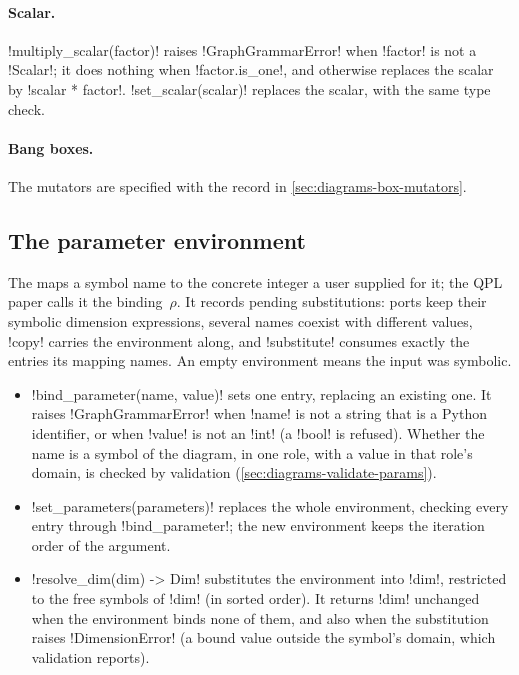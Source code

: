 \paragraph{Scalar.} \py!multiply_scalar(factor)! raises \py!GraphGrammarError! when \py!factor! is not a \py!Scalar!; it does nothing when \py!factor.is_one!, and otherwise replaces the scalar by \py!scalar * factor!. \py!set_scalar(scalar)! replaces the scalar, with the same type check.

\paragraph{Bang boxes.} The \bbox{} mutators are specified with the \bbox{} record in \cref{sec:diagrams-box-mutators}.

\subsection{The parameter environment}\label{sec:diagrams-params}

The  maps a symbol name to the concrete integer a user supplied for it; the QPL paper calls it the binding~$\rho$. It records pending substitutions: ports keep their symbolic dimension expressions, several names coexist with different values, \py!copy! carries the environment along, and \py!substitute! consumes exactly the entries its mapping names. An empty environment means the input was symbolic.

\begin{itemize}
\item \py!bind_parameter(name, value)! sets one entry, replacing an existing one. It raises \py!GraphGrammarError! when \py!name! is not a string that is a Python identifier, or when \py!value! is not an \py!int! (a \py!bool! is refused). Whether the name is a symbol of the diagram, in one role, with a value in that role's domain, is checked by validation (\cref{sec:diagrams-validate-params}).
\item \py!set_parameters(parameters)! replaces the whole environment, checking every entry through \py!bind_parameter!; the new environment keeps the iteration order of the argument.
\item \py!resolve_dim(dim) -> Dim! substitutes the environment into \py!dim!, restricted to the free symbols of \py!dim! (in sorted order). It returns \py!dim! unchanged when the environment binds none of them, and also when the substitution raises \py!DimensionError! (a bound value outside the symbol's domain, which validation reports).
\end{itemize}

